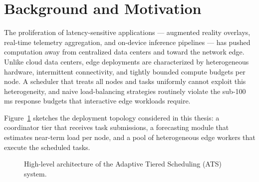 \section{Background and Motivation}

The proliferation of latency-sensitive applications --- augmented reality overlays,
real-time telemetry aggregation, and on-device inference pipelines --- has pushed
computation away from centralized data centers and toward the network edge. Unlike
cloud data centers, edge deployments are characterized by heterogeneous hardware,
intermittent connectivity, and tightly bounded compute budgets per node. A scheduler
that treats all nodes and tasks uniformly cannot exploit this heterogeneity, and
naive load-balancing strategies routinely violate the sub-100\,ms response budgets
that interactive edge workloads require.

Figure~\ref{fig:architecture} sketches the deployment topology considered in this
thesis: a coordinator tier that receives task submissions, a forecasting module
that estimates near-term load per node, and a pool of heterogeneous edge workers
that execute the scheduled tasks.

\begin{figure}[h]
\centering
{}
\caption{High-level architecture of the Adaptive Tiered Scheduling (ATS) system.}
\label{fig:architecture}
\end{figure}
